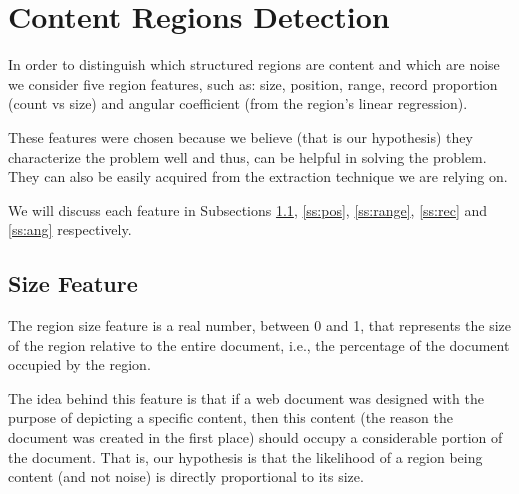 \section{Content Regions Detection}\label{sec:content}
In order to distinguish which structured regions are content and which are noise
we consider five region features, such as: size, position, range, record
proportion (count vs size) and angular coefficient (from the region's linear
regression).

These features were chosen because we believe (that is our hypothesis) they
characterize the problem well and thus, can be helpful in solving the problem.
They can also be easily acquired from the extraction technique we are relying
on.

We will discuss each feature in Subsections \ref{ss:size}, \ref{ss:pos},
\ref{ss:range}, \ref{ss:rec}  and \ref{ss:ang} respectively.

\subsection{Size Feature}\label{ss:size}
The region size feature is a real number, between 0 and 1, that represents the
size of the region relative to the entire document, i.e., the percentage of the
document occupied by the region.

The idea behind this feature is that if a web document was designed with the
purpose of depicting a specific content, then this content (the reason the
document was created in the first place) should occupy a considerable portion of
the document. That is, our hypothesis is that the likelihood of a region being
content (and not noise) is directly proportional to its size.

